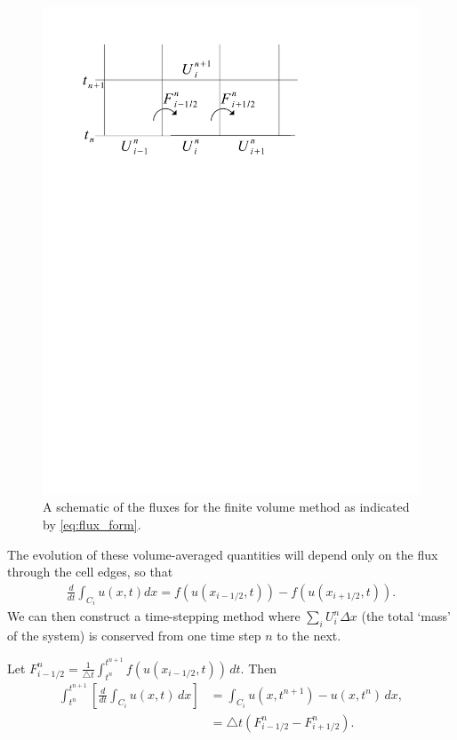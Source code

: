\begin{figure}[ht]
\centering
\includegraphics[trim= 20mm 195mm 0mm 30mm, clip]{flux_form.pdf}
\caption{A schematic of the fluxes for the finite volume method as indicated by \eqref{eq:flux_form}.}
\end{figure}

The evolution of these volume-averaged quantities will depend only on the flux through the cell edges, so that
\begin{align}\label{eq:1D_semi_continuous}
\frac{d}{dt}\int_{C_i} u(x,t) dx = f(u(x_{i-1/2},t))-f(u(x_{i+1/2},t)).
\end{align}
We can then construct a time-stepping method where $\sum_i U_i^n\Delta x$ (the total `mass' of the system) is conserved from one time step $n$ to the next.  

Let $F^n_{i-1/2} = \frac{1}{\triangle t}\int_{t^n}^{t^{n+1}} f(u(x_{i-1/2},t)) \, dt.$ Then 
\begin{align*}
\int_{t^n}^{t^{n+1}} \left[ \frac{d}{dt}\int_{C_i} u(x,t)\, dx \right] 
&{}= \int_{C_i} u(x,t^{n+1}) - u(x,t^{n})\, dx ,\\
&{ }= \triangle t \left(F^n_{i-1/2} - F^n_{i+1/2}\right).
\end{align*}


